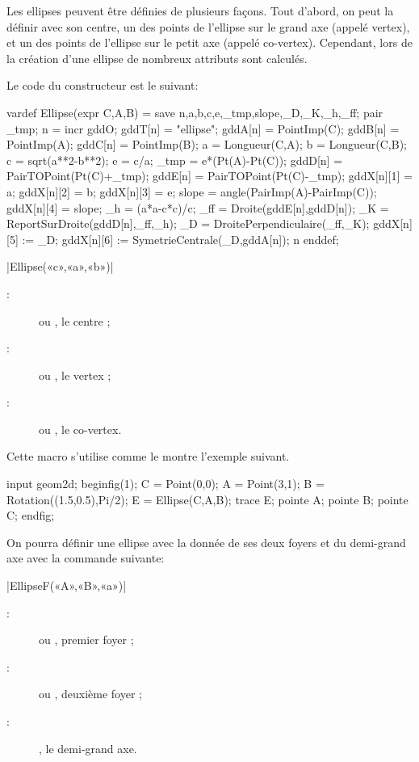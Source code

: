 \documentclass[a4paper,french]{article}
\begin{document}
Les ellipses peuvent être définies de plusieurs façons. Tout d'abord, on peut la
définir avec son centre, un des points de l'ellipse sur le grand axe (appelé
vertex), et un des points de l'ellipse sur le petit axe (appelé co-vertex).
Cependant, lors de la création d'une ellipse de nombreux attributs sont calculés.

Le code du constructeur est le suivant:
\begin{mpcode}
  vardef Ellipse(expr C,A,B) = 
  save n,a,b,c,e,_tmp,slope,_D,_K,_h,_ff; 
  pair _tmp;
  n = incr gddO;
  gddT[n] = "ellipse"; gddA[n] = PointImp(C); gddB[n] = PointImp(A);
  gddC[n] = PointImp(B);
  a = Longueur(C,A);
  b = Longueur(C,B);
  c = sqrt(a**2-b**2);
  e = c/a;
  _tmp = e*(Pt(A)-Pt(C));
  gddD[n] = PairTOPoint(Pt(C)+_tmp);
  gddE[n] = PairTOPoint(Pt(C)-_tmp);
  gddX[n][1] = a;
  gddX[n][2] = b;
  gddX[n][3] = e;
  slope = angle(PairImp(A)-PairImp(C));
  gddX[n][4] = slope;
  _h = (a*a-c*c)/c;
  _ff = Droite(gddE[n],gddD[n]);
  _K = ReportSurDroite(gddD[n],_ff,_h);
  _D = DroitePerpendiculaire(_ff,_K);
  gddX[n][5] := _D; %
  gddX[n][6] := SymetrieCentrale(_D,gddA[n]); %
  n
enddef;
\end{mpcode}

\begin{colourband}
\macro|Ellipse(«c»,«a»,«b»)|
\begin{description}
  \item[:]   ou , le centre ;
  \item[:]   ou , le vertex ;
  \item[:]   ou , le co-vertex.
\end{description}
\end{colourband}
\bigskip

Cette macro s'utilise comme le montre l'exemple suivant.
\begin{ExempleMP}
input geom2d;
beginfig(1);
C = Point(0,0);
A = Point(3,1);
B = Rotation((1.5,0.5),Pi/2);
E = Ellipse(C,A,B);
trace E;
pointe A; pointe B; pointe C;
endfig;
\end{ExempleMP}

On pourra définir une ellipse avec la donnée de ses deux foyers et du 
demi-grand axe avec la commande suivante:
\begin{colourband}
\macro|EllipseF(«A»,«B»,«a»)|
\begin{description}
  \item[:]   ou , premier foyer ;
  \item[:]   ou , deuxième foyer ;
  \item[:]  , le demi-grand axe.
\end{description}
\end{colourband}
\bigskip
\end{document}
